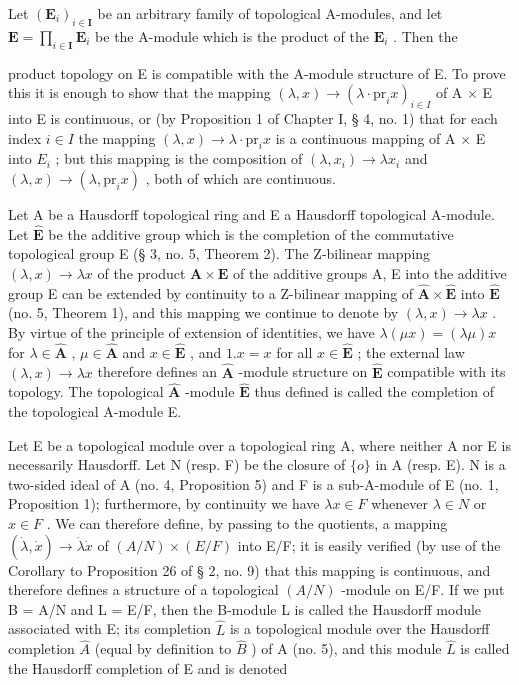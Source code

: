 Let \((\mathbf{E}_i)_{i\in \mathbf{I}}\) be an arbitrary family of topological A-modules, and let \(\mathbf{E} = \prod_{i\in \mathbf{I}}\mathbf{E}_i\) be the A-module which is the product of the \(\mathbf{E}_i\) . Then the

product topology on E is compatible with the A-module structure of E. To prove this it is enough to show that the mapping \((\lambda, x) \to (\lambda \cdot \text{pr}_i x)_{i \in I}\) of A × E into E is continuous, or (by Proposition 1 of Chapter I, § 4, no. 1) that for each index \(i \in I\) the mapping \((\lambda, x) \to \lambda \cdot \text{pr}_i x\) is a continuous mapping of A × E into \(E_i\) ; but this mapping is the composition of \((\lambda, x_i) \to \lambda x_i\) and \((\lambda, x) \to (\lambda, \text{pr}_i x)\) , both of which are continuous.

Let A be a Hausdorff topological ring and E a Hausdorff topological A-module. Let \(\hat{\mathbf{E}}\) be the additive group which is the completion of the commutative topological group E (§ 3, no. 5, Theorem 2). The Z-bilinear mapping \((\lambda, x) \to \lambda x\) of the product \(\mathbf{A} \times \mathbf{E}\) of the additive groups A, E into the additive group E can be extended by continuity to a Z-bilinear mapping of \(\hat{\mathbf{A}} \times \hat{\mathbf{E}}\) into \(\hat{\mathbf{E}}\) (no. 5, Theorem 1), and this mapping we continue to denote by \((\lambda, x) \to \lambda x\) . By virtue of the principle of extension of identities, we have \(\lambda(\mu x) = (\lambda \mu)x\) for \(\lambda \in \hat{\mathbf{A}}\) , \(\mu \in \hat{\mathbf{A}}\) and \(x \in \hat{\mathbf{E}}\) , and \(1.x = x\) for all \(x \in \hat{\mathbf{E}}\) ; the external law \((\lambda, x) \to \lambda x\) therefore defines an \(\hat{\mathbf{A}}\) -module structure on \(\hat{\mathbf{E}}\) compatible with its topology. The topological \(\hat{\mathbf{A}}\) -module \(\hat{\mathbf{E}}\) thus defined is called the completion of the topological A-module E.

Let E be a topological module over a topological ring A, where neither A nor E is necessarily Hausdorff. Let N (resp. F) be the closure of \(\{o\}\) in A (resp. E). N is a two-sided ideal of A (no. 4, Proposition 5) and F is a sub-A-module of E (no. 1, Proposition 1); furthermore, by continuity we have \(\lambda x \in F\) whenever \(\lambda \in N\) or \(x \in F\) . We can therefore define, by passing to the quotients, a mapping \((\dot{\lambda}, \dot{x}) \to \dot{\lambda} \dot{x}\) of \((A/N) \times (E/F)\) into E/F; it is easily verified (by use of the Corollary to Proposition 26 of § 2, no. 9) that this mapping is continuous, and therefore defines a structure of a topological \((A/N)\) -module on E/F. If we put B = A/N and L = E/F, then the B-module L is called the Hausdorff module associated with E; its completion \(\hat{L}\) is a topological module over the Hausdorff completion \(\hat{A}\) (equal by definition to \(\hat{B}\) ) of A (no. 5), and this module \(\hat{L}\) is called the Hausdorff completion of E and is denoted

